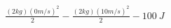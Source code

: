 \documentclass[preview]{standalone}
\begin{document}
\begin{align*}
\frac{(2 kg)(0 m/s)^2}{2} - \frac{(2 kg)(10 m/s)^2}{2} -100 \ J
\end{align*}
\end{document}
